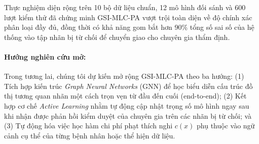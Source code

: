 \documentclass[11pt,a4paper]{article}
\begin{document}
Thực nghiệm diện rộng trên 10 bộ dữ liệu chuẩn, 12 mô hình đối sánh và 600 lượt kiểm thử đã chứng minh GSI-MLC-PA vượt trội toàn diện về độ chính xác phân loại đầy đủ, đồng thời có khả năng gom bắt hơn 90\% tổng số sai số của hệ thống vào tập nhãn bị từ chối để chuyển giao cho chuyên gia thẩm định.

\paragraph{Hướng nghiên cứu mở:} Trong tương lai, chúng tôi dự kiến mở rộng GSI-MLC-PA theo ba hướng: (1) Tích hợp kiến trúc \textit{Graph Neural Networks} (GNN) để học biểu diễn cấu trúc đồ thị tương quan nhãn một cách trọn vẹn từ đầu đến cuối (end-to-end); (2) Kết hợp cơ chế \textit{Active Learning} nhằm tự động cập nhật trọng số mô hình ngay sau khi nhận được phản hồi kiểm duyệt của chuyên gia trên các nhãn bị từ chối; và (3) Tự động hóa việc học hàm chi phí phạt thích nghi $c(x)$ phụ thuộc vào ngữ cảnh cụ thể của từng bệnh nhân hoặc thể hiện dữ liệu.
\end{document}
